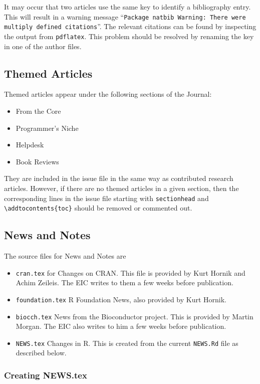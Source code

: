 \documentclass[11pt]{article}
\begin{document}
It may occur that two articles use the same key to identify a
bibliography entry. This will result in a warning message
``\texttt{Package natbib Warning: There were multiply defined
  citations}''.  The relevant citations can be found by inspecting the
output from \texttt{pdflatex}.  This problem should be resolved by
renaming the key in one of the author files.

\subsection{Themed Articles}

Themed articles appear under the following sections of the Journal:
\begin{itemize}
\item From the Core
\item Programmer's Niche
\item Helpdesk
\item Book Reviews
\end{itemize}
They are included in the issue file in the same way as contributed
research articles. However, if there are no themed articles in a given
section, then the corresponding lines in the issue file starting with
\verb+sectionhead+ and \verb+\addtocontents{toc}+ should be removed or
commented out.

\subsection{News and Notes}

The source files for News and Notes are
\begin{itemize}
\item \texttt{cran.tex} for Changes on CRAN. This file is provided by
  Kurt Hornik and Achim Zeileis. The EIC writes to them a few weeks
  before publication.
\item \texttt{foundation.tex} R Foundation News, also provided by Kurt Hornik.
\item \texttt{biocch.tex} News from the Bioconductor project. This is
  provided by Martin Morgan. The EIC also writes to him a few weeks
  before publication.
\item \texttt{NEWS.tex} Changes in R.  This is created from the current
  \texttt{NEWS.Rd} file as described below.
\end{itemize}

\subsubsection{Creating NEWS.tex}
\end{document}
